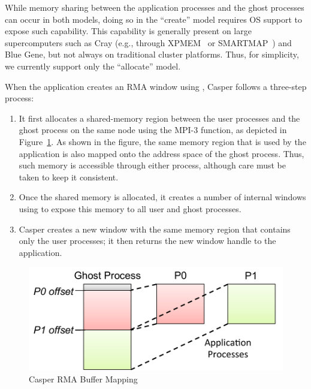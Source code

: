While memory sharing between the application
processes and the ghost processes can occur in both models, doing so in the
``create'' model requires OS support to expose such capability.  This
capability is generally present on large supercomputers such as Cray
(e.g., through XPMEM~\cite{xpmem} or SMARTMAP~\cite{smartmap}) and
Blue Gene, but not always on traditional cluster platforms.  Thus, for
simplicity, we currently support only the ``allocate'' model.

When the application creates an RMA window using
, Casper follows a three-step process:

\begin{enumerate}

  \item It first allocates a shared-memory region between the user
    processes and the ghost process on the same node using the MPI-3
     function, as depicted in
    Figure~\ref{fig:deg-mem-map}.  As shown in the figure, the same
    memory region that is used by the application is also mapped onto
    the address space of the ghost process.  Thus, such memory is
    accessible through either process, although care must be taken to
    keep it consistent.

  \item Once the shared memory is allocated, it creates a number of
    internal windows using  to expose this memory
    to all user and ghost processes.

  \item Casper creates a new window with the same memory region
    that contains only the user processes; it then returns the new window
    handle to the application.

\end{enumerate}

\begin{figure}[tbp]
\centering
\includegraphics[width=0.7\columnwidth]{figures/casper/design_mem_map.pdf}
\caption{Casper RMA Buffer Mapping}
\label{fig:deg-mem-map}
\end{figure}

